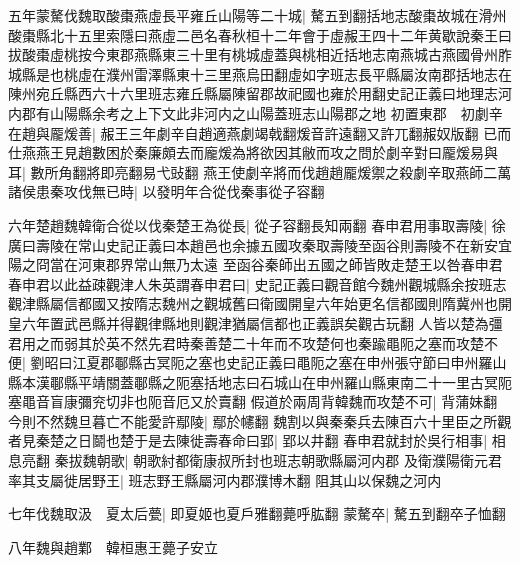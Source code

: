 五年蒙驁伐魏取酸棗燕虛長平雍丘山陽等二十城|{
	驁五到翻括地志酸棗故城在滑州酸棗縣北十五里索隱曰燕虛二邑名春秋桓十二年會于虛赧王四十二年黄歇說秦王曰拔酸棗虛桃按今東郡燕縣東三十里有桃城虛蓋與桃相近括地志南燕城古燕國骨州胙城縣是也桃虛在濮州雷澤縣東十三里燕烏田翻虛如字班志長平縣屬汝南郡括地志在陳州宛丘縣西六十六里班志雍丘縣屬陳留郡故祀國也雍於用翻史記正義曰地理志河内郡有山陽縣余考之上下文此非河内之山陽蓋班志山陽郡之地}
初置東郡　初劇辛在趙與龎煖善|{
	赧王三年劇辛自趙適燕劇竭戟翻煖音許遠翻又許兀翻赧奴版翻}
已而仕燕燕王見趙數困於秦廉頗去而龐煖為將欲因其敝而攻之問於劇辛對曰龎煖易與耳|{
	數所角翻將即亮翻易弋䜴翻}
燕王使劇辛將而伐趙趙龎煖禦之殺劇辛取燕師二萬　諸侯患秦攻伐無已時|{
	以發明年合從伐秦事從子容翻}


六年楚趙魏韓衛合從以伐秦楚王為從長|{
	從子容翻長知兩翻}
春申君用事取壽陵|{
	徐廣曰壽陵在常山史記正義曰本趙邑也余據五國攻秦取壽陵至函谷則壽陵不在新安宜陽之冏當在河東郡界常山無乃太遠}
至函谷秦師出五國之師皆敗走楚王以咎春申君春申君以此益疎觀津人朱英謂春申君曰|{
	史記正義曰觀音館今魏州觀城縣余按班志觀津縣屬信都國又按隋志魏州之觀城舊曰衛國開皇六年始更名信都國則隋冀州也開皇六年置武邑縣并得觀律縣地則觀津猶屬信都也正義誤矣觀古玩翻}
人皆以楚為彊君用之而弱其於英不然先君時秦善楚二十年而不攻楚何也秦踰黽阨之塞而攻楚不便|{
	劉昭曰江夏郡鄳縣古冥阨之塞也史記正義曰黽阨之塞在申州張守節曰申州羅山縣本漢鄳縣平靖關蓋鄳縣之阨塞括地志曰石城山在申州羅山縣東南二十一里古冥阨塞黽音盲康彌兖切非也阨音厄又於賣翻}
假道於兩周背韓魏而攻楚不可|{
	背蒲妹翻}
今則不然魏旦暮亡不能愛許鄢陵|{
	鄢於幰翻}
魏割以與秦秦兵去陳百六十里臣之所觀者見秦楚之日鬬也楚于是去陳徙壽春命曰郢|{
	郢以井翻}
春申君就封於吳行相事|{
	相息亮翻}
秦拔魏朝歌|{
	朝歌紂都衛康叔所封也班志朝歌縣屬河内郡}
及衛濮陽衛元君率其支屬徙居野王|{
	班志野王縣屬河内郡濮博木翻}
阻其山以保魏之河内

七年伐魏取汲　夏太后甍|{
	即夏姬也夏戶雅翻薨呼肱翻}
蒙驁卒|{
	驁五到翻卒子恤翻}


八年魏與趙鄴　韓桓惠王薨子安立


